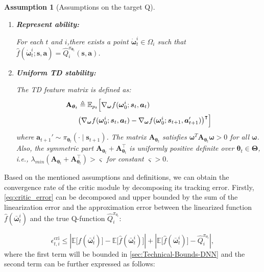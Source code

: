 \documentclass{IEEEtran}
\newtheorem{assumption}{Assumption}
\begin{document}
\begin{assumption}[Assumptions on the target Q]~
\label{assumption:target_Q}
\begin{enumerate}
\item \textbf{Represent ability:}

For each $t$ and $i$,there exists a point $\dot{\boldsymbol{\omega}}_{t}^{i}\in\Omega_{i}$ such that $\hat{f}(\dot{\boldsymbol{\omega}}_{t}^{i};\boldsymbol{s},\boldsymbol{a})=\hat{Q}_{i}^{\pi_{\boldsymbol{\theta}_{t}}}(\boldsymbol{s},\boldsymbol{a})$.
\item \textbf{Uniform TD stability:}

The TD feature matrix is defined as:
\begin{align}
\mathbf{A}_{\boldsymbol{\theta}_{t}} & \triangleq\mathbb{E}_{p_{t}}\Bigl[\nabla_{\boldsymbol{\omega}}f(\boldsymbol{\omega}_{0}^{i};\boldsymbol{s}_{t},\boldsymbol{a}_{t})\nonumber \\
& \bigl(\nabla_{\boldsymbol{\omega}}f(\boldsymbol{\omega}_{0}^{i};\boldsymbol{s}_{t},\boldsymbol{a}_{t})-\nabla_{\boldsymbol{\omega}}f(\boldsymbol{\omega}_{0}^{i};\boldsymbol{s}_{t+1},\boldsymbol{a}_{t+1}')\bigr)^{\intercal}\Bigr]
\end{align}
where $\boldsymbol{a}_{t+1}'\sim\pi_{\boldsymbol{\theta}_{t}}(\cdot\mid\boldsymbol{s}_{t+1})$. The matrix $\mathbf{A}_{\boldsymbol{\theta}_{t}}$ satisfies $\mathbf{\boldsymbol{\omega}^{\mathit{T}}A}_{\boldsymbol{\theta}_{t}}\boldsymbol{\omega}>0$ for all $\boldsymbol{\omega}$. Also, the symmetric part $\mathbf{A}_{\boldsymbol{\theta}_{t}}+\mathbf{A}_{\boldsymbol{\theta}_{t}}^{\intercal}$ is uniformly positive definite over $\boldsymbol{\theta}_{t}\in\boldsymbol{\Theta}$, i.e., $\lambda_{min}(\mathbf{A}_{\boldsymbol{\theta}_{t}}+\mathbf{A}_{\boldsymbol{\theta}_{t}}^{\intercal})>\varsigma$ for constant $\varsigma>0$.
\end{enumerate}
\end{assumption}

Based on the mentioned assumptions and definitions, we can obtain the convergence rate of the critic module by decomposing its tracking error. Firstly, \eqref{eq:critic_error} can be decomposed and upper bounded by the sum of the linearization error and the approximation error between the linearized function $\hat{f}(\bar{\boldsymbol{\omega}}_{t}^{i})$ and the true Q-function $\hat{Q}_{i}^{\pi_{\theta_{t}}}$:

\begin{equation}
\epsilon_{t,i}^{\mathrm{cri}}\le\left|\mathbb{E}\big[f(\bar{\boldsymbol{\omega}}_{t}^{i})\big]-\mathbb{E}\big[\hat{f}(\bar{\boldsymbol{\omega}}_{t}^{i})\big]\right|+\left|\mathbb{E}\big[\hat{f}(\bar{\boldsymbol{\omega}}_{t}^{i})\big]-\hat{Q}_{i}^{\pi_{\theta_{t}}}\right|,
\end{equation}
where the first term will be bounded in \ref{sec:Technical-Bounds-DNN} and the second term can be further expressed as follows:
\end{document}
